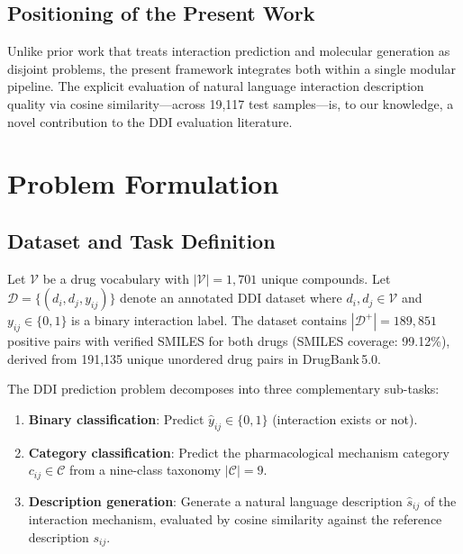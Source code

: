 \documentclass[conference]{IEEEtran}
\begin{document}
\subsection{Positioning of the Present Work}

Unlike prior work that treats interaction prediction and molecular generation as disjoint
problems, the present framework integrates both within a single modular pipeline. The
explicit evaluation of natural language interaction description quality via cosine
similarity---across 19,117 test samples---is, to our knowledge, a novel contribution to
the DDI evaluation literature.

\section{Problem Formulation}
\label{sec:formulation}

\subsection{Dataset and Task Definition}

Let $\mathcal{V}$ be a drug vocabulary with $|\mathcal{V}| = 1{,}701$ unique compounds.
Let $\mathcal{D} = \{(d_i, d_j, y_{ij})\}$ denote an annotated DDI dataset where $d_i, d_j
\in \mathcal{V}$ and $y_{ij} \in \{0,1\}$ is a binary interaction label. The dataset
contains $|\mathcal{D}^+| = 189{,}851$ positive pairs with verified SMILES for both drugs
(SMILES coverage: 99.12\%), derived from 191,135 unique unordered drug pairs in DrugBank\,5.0.

The DDI prediction problem decomposes into three complementary sub-tasks:
\begin{enumerate}
  \item \textbf{Binary classification}: Predict $\hat{y}_{ij}\in\{0,1\}$ (interaction
  exists or not).
  \item \textbf{Category classification}: Predict the pharmacological mechanism category
  $c_{ij} \in \mathcal{C}$ from a nine-class taxonomy $|\mathcal{C}|=9$.
  \item \textbf{Description generation}: Generate a natural language description
  $\hat{s}_{ij}$ of the interaction mechanism, evaluated by cosine similarity against the
  reference description $s_{ij}$.
\end{enumerate}
\end{document}
